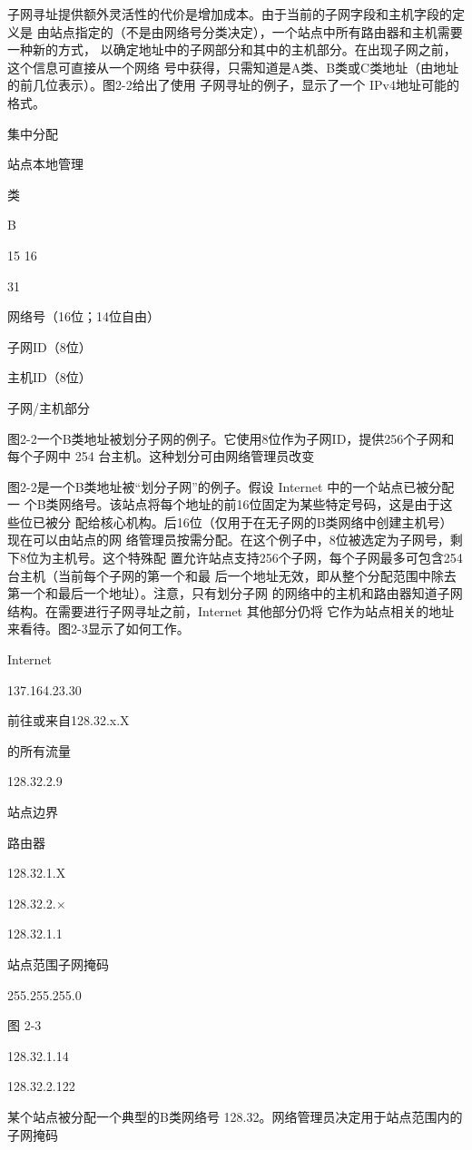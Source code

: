 子网寻址提供额外灵活性的代价是增加成本。由于当前的子网字段和主机字段的定义是
由站点指定的（不是由网络号分类决定），一个站点中所有路由器和主机需要一种新的方式，
以确定地址中的子网部分和其中的主机部分。在出现子网之前，这个信息可直接从一个网络
号中获得，只需知道是A类、B类或C类地址（由地址的前几位表示）。图2-2给出了使用
子网寻址的例子，显示了一个 IPv4地址可能的格式。

集中分配

站点本地管理

类

B

15 16

31

网络号（16位；14位自由）

子网ID（8位）

主机ID（8位）

子网/主机部分

图2-2一个B类地址被划分子网的例子。它使用8位作为子网ID，提供256个子网和每个子网中
254 台主机。这种划分可由网络管理员改变

图2-2是一个B类地址被“划分子网”的例子。假设 Internet 中的一个站点已被分配一
个B类网络号。该站点将每个地址的前16位固定为某些特定号码，这是由于这些位已被分
配给核心机构。后16位（仅用于在无子网的B类网络中创建主机号）现在可以由站点的网
络管理员按需分配。在这个例子中，8位被选定为子网号，剩下8位为主机号。这个特殊配
置允许站点支持256个子网，每个子网最多可包含254台主机（当前每个子网的第一个和最
后一个地址无效，即从整个分配范围中除去第一个和最后一个地址）。注意，只有划分子网
的网络中的主机和路由器知道子网结构。在需要进行子网寻址之前，Internet 其他部分仍将
它作为站点相关的地址来看待。图2-3显示了如何工作。

Internet

137.164.23.30

前往或来自128.32.x.X

的所有流量

128.32.2.9

站点边界

路由器

128.32.1.X

128.32.2.×

128.32.1.1

站点范围子网掩码

255.255.255.0

图 2-3

128.32.1.14

128.32.2.122

某个站点被分配一个典型的B类网络号 128.32。网络管理员决定用于站点范围内的子网掩码

